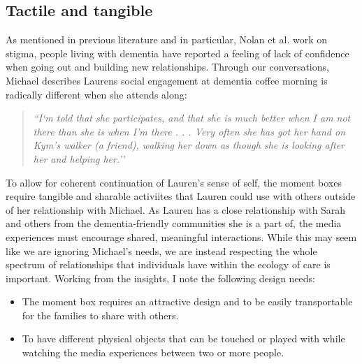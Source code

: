 \subsection{Tactile and tangible}
\label{DR:ProvidingChoice}
As mentioned in previous literature and in particular, Nolan et al. work on stigma, people living with dementia have reported a feeling of lack of confidence when going out and building new relationships. Through our conversations, Michael describes Laurens social engagement at dementia coffee morning is radically different when she attends along:
\begin{quote}
\textit{    ``I`m told that she participates, and that she is much better when I am not there than she is when I’m there . . . Very often she has got her hand on Kym’s walker (a friend), walking her down as though she is looking after her and helping her.''
}
\end{quote}

To allow for coherent continuation of Lauren’s sense of self, the moment boxes require tangible and sharable activiites that Lauren could use with others outside of her relationship with Michael. As Lauren has a close relationship with Sarah and others from the dementia-friendly communities she is a part of, the media experiences must encourage shared, meaningful interactions. While this may seem like we are ignoring Michael’s needs, we are instead respecting the whole spectrum of relationships that individuals have within the ecology of care is important. Working from the insights, I note the following design needs:
\begin{itemize}
    \item The moment box requires an attractive design and to be easily transportable for the families to share with others.
    \item To have different physical objects that can be touched or played with while watching the media experiences between two or more people. 
\end{itemize}


